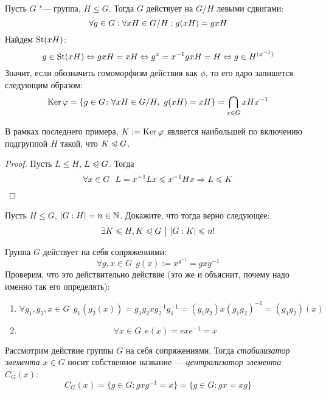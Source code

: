 \begin{example}
	Пусть $G$ "--- группа, $H \le G$. Тогда $G$ действует на $G / H$ левыми сдвигами: 
	\[
		\forall g \hm\in G: \forall xH \in G / H: g(xH) = gxH
	\]
	Найдем $\operatorname{St}(xH)$:
	\[
		g \in \operatorname{St}(xH) \Leftrightarrow gxH = xH \Leftrightarrow g^x = x^{-1} gxH = H \Leftrightarrow g \in H^{(x^{-1})}
	\]
	Значит, если обозначить гомоморфизм действия как $\phi$, то его ядро запишется следующим образом:
	\[
		\ke\phi = \{g \in G \colon \forall xH \in G / H,\ g(xH) = xH\} = \bigcap_{x \in G} xHx^{-1}
	\]
\end{example}

\begin{proposition}
	В рамках последнего примера, $K := \operatorname{Ker}\varphi$ является наибольшей по включению подгруппой $H$ такой, что $K \trianglelefteqslant G$.
\end{proposition}

\begin{proof}
	Пусть $L \le H$, $L \trianglelefteqslant G$. Тогда
	\[
		\forall x \in G\ \ L = x^{-1}Lx \leqslant x^{-1}Hx \Rightarrow L \leqslant K
	\]
\end{proof}

\begin{exercise}
	Пусть $H \le G$, $|G : H| = n \in \mathbb{N}$. Докажите, что тогда верно следующее:
	\[
		\exists K \leqslant H, K \trianglelefteqslant G \ \big|\  |G : K| \leqslant n!
	\]
\end{exercise}

\begin{example}
	Группа $G$ действует на себя сопряжениями:
	\[
		\forall g, x \in G\ \ g(x) := x^{g^{-1}} = gxg^{-1}
	\]
	Проверим, что это действительно действие (это же и объяснит, почему надо именно так его определять):
	\begin{enumerate}
		\item \[
			\forall g_1, g_2, x \in G\ \ g_1(g_2(x)) = g_1 g_2xg_2^{-1} g_1^{-1} = (g_1 g_2) x (g_1 g_2)^{-1} = (g_1 g_2)(x)
		\]
		
		\item \[
			\forall x \in G\ \ e(x) = exe^{-1} = x
		\]
	\end{enumerate}
\end{example}

\begin{definition}
	Рассмотрим действие группы $G$ на себя сопряжениями. Тогда \textit{стабилизатор элемента $x \in G$} носит собственное название --- \textit{централизатор элемента} $C_G(x)$:
	\[
		C_G(x) = \{g \in G \colon gxg^{-1} = x\} = \{g \in G \colon gx = xg\}
	\]
\end{definition}

